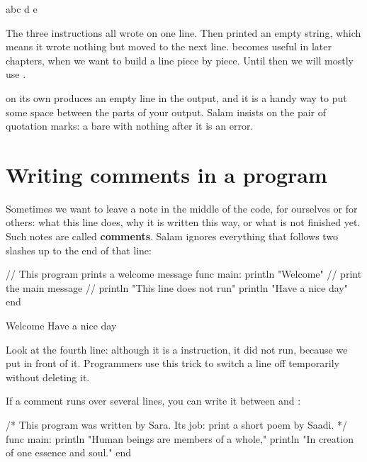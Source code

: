 \begin{salamout}
abc
d
e
\end{salamout}

The three  instructions all wrote on one line. Then
 printed an empty string, which means it wrote nothing but
moved to the next line.  becomes useful in later chapters, when
we want to build a line piece by piece. Until then we will mostly use
.

\begin{tip}
 on its own produces an empty line in the output, and it is
a handy way to put some space between the parts of your output. Salam
insists on the pair of quotation marks: a bare  with nothing
after it is an error.
\end{tip}

\section{Writing comments in a program}

Sometimes we want to leave a note in the middle of the code, for ourselves or
for others: what this line does, why it is written this way, or what is not
finished yet. Such notes are called \textbf{comments}. Salam ignores
everything that follows two slashes \code{//} up to the end of that line:

\begin{salamcode}
// This program prints a welcome message
func main:
    println "Welcome"    // print the main message
    // println "This line does not run"
    println "Have a nice day"
end
\end{salamcode}

\begin{salamout}
Welcome
Have a nice day
\end{salamout}

Look at the fourth line: although it is a  instruction, it did
not run, because we put \code{//} in front of it. Programmers use this trick
to switch a line off temporarily without deleting it.

If a comment runs over several lines, you can write it between \code{/*} and
\code{*/}:

\begin{salamcode}
/*
   This program was written by Sara.
   Its job: print a short poem by Saadi.
*/
func main:
    println "Human beings are members of a whole,"
    println "In creation of one essence and soul."
end
\end{salamcode}

